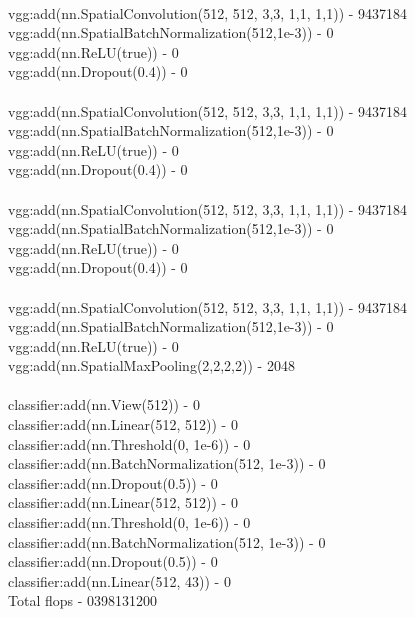 \documentclass[11pt]{article}
\begin{document}
\\
vgg:add(nn.SpatialConvolution(512, 512, 3,3, 1,1, 1,1)) - 9437184 \\
vgg:add(nn.SpatialBatchNormalization(512,1e-3)) - 0 \\
vgg:add(nn.ReLU(true)) - 0 \\
vgg:add(nn.Dropout(0.4)) - 0 \\
\\
vgg:add(nn.SpatialConvolution(512, 512, 3,3, 1,1, 1,1)) - 9437184 \\
vgg:add(nn.SpatialBatchNormalization(512,1e-3)) - 0 \\
vgg:add(nn.ReLU(true)) - 0 \\
vgg:add(nn.Dropout(0.4)) - 0 \\
\\
vgg:add(nn.SpatialConvolution(512, 512, 3,3, 1,1, 1,1)) - 9437184 \\
vgg:add(nn.SpatialBatchNormalization(512,1e-3)) - 0 \\
vgg:add(nn.ReLU(true)) - 0 \\
vgg:add(nn.Dropout(0.4)) - 0 \\
\\
vgg:add(nn.SpatialConvolution(512, 512, 3,3, 1,1, 1,1)) - 9437184 \\
vgg:add(nn.SpatialBatchNormalization(512,1e-3)) - 0 \\
vgg:add(nn.ReLU(true)) - 0 \\
vgg:add(nn.SpatialMaxPooling(2,2,2,2)) - 2048 \\
\\
classifier:add(nn.View(512)) - 0 \\
classifier:add(nn.Linear(512, 512)) - 0 \\
classifier:add(nn.Threshold(0, 1e-6)) - 0 \\
classifier:add(nn.BatchNormalization(512, 1e-3)) - 0 \\
classifier:add(nn.Dropout(0.5)) - 0 \\
classifier:add(nn.Linear(512, 512)) - 0 \\
classifier:add(nn.Threshold(0, 1e-6)) - 0 \\
classifier:add(nn.BatchNormalization(512, 1e-3)) - 0 \\
classifier:add(nn.Dropout(0.5)) - 0 \\
classifier:add(nn.Linear(512, 43)) - 0 \\

Total flops - 0398131200
\end{document}
